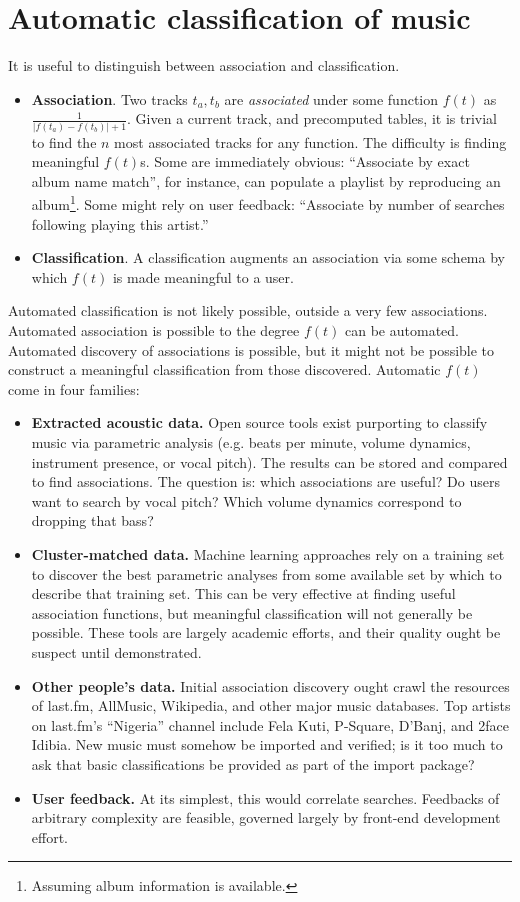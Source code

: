\documentclass[]{sigplanconf}
\begin{document}
\section{Automatic classification of music}
It is useful to distinguish between association and classification.
\begin{itemize}
\item \textbf{Association}. Two tracks $t_a, t_b$ are \textit{associated} under
some function $f(t)$ as $\frac{1}{| f(t_a) - f(t_b) | + 1}$. Given a current
track, and precomputed tables, it is trivial to find the $n$ most associated
tracks for any function. The difficulty is finding meaningful $f(t)$s. Some
are immediately obvious: ``Associate by exact album name match'', for instance,
can populate a playlist by reproducing an album\footnote{Assuming album
information is available.}. Some might rely on user feedback: ``Associate by
number of searches following playing this artist.''
\item \textbf{Classification}. A classification augments an association
via some schema by which $f(t)$ is made meaningful to a user.
\end{itemize}
Automated classification is not likely possible, outside a very few
associations. Automated association is possible to the degree $f(t)$ can
be automated. Automated discovery of associations is possible, but it might
not be possible to construct a meaningful classification from those
discovered. Automatic $f(t)$ come in four families:
\begin{itemize}
\item \textbf{Extracted acoustic data.} Open source tools exist purporting
to classify music via parametric analysis (e.g. beats per minute, volume
dynamics, instrument presence, or vocal pitch). The results can be stored and
compared to find associations. The question is: which associations are useful?
Do users want to search by vocal pitch? Which volume dynamics correspond to
dropping that bass?
\item \textbf{Cluster-matched data.} Machine learning approaches rely on a
training set to discover the best parametric analyses from some available set
by which to describe that training set. This can be very effective at finding
useful association functions, but meaningful classification will not
generally be possible. These tools are largely academic efforts, and their
quality ought be suspect until demonstrated.
\item \textbf{Other people's data.} Initial association discovery ought
crawl the resources of last.fm, AllMusic, Wikipedia, and other major music
databases. Top artists on last.fm's ``Nigeria'' channel include Fela Kuti,
P-Square, D'Banj, and 2face Idibia. New music must somehow be imported and
verified; is it too much to ask that basic classifications be provided as
part of the import package?
\item \textbf{User feedback.} At its simplest, this would correlate searches.
Feedbacks of arbitrary complexity are feasible, governed largely by front-end
development effort.
\end{itemize}
\end{document}
